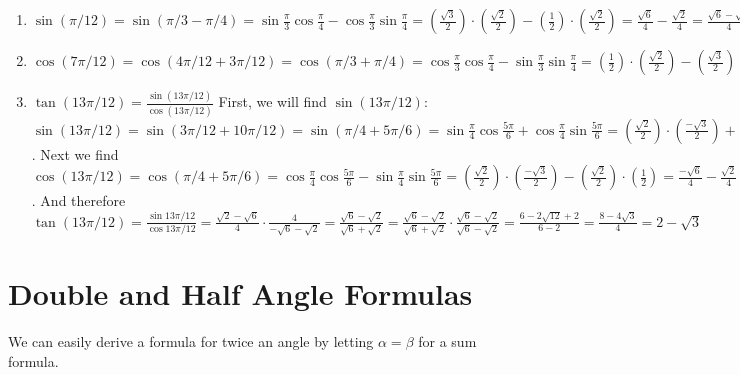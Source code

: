 \begin{Answer}[ref = sum_diff]
\begin{enumerate}
\item $\sin{\left( \pi/12 \right) } = \sin{\left( \pi/3 - \pi/4 \right)} = 
\sin{\frac{\pi}{3}}\cos{\frac{\pi}{4}} - \cos{\frac{\pi}{3}}\sin{\frac{\pi}{4}}
= \left( \frac{\sqrt{3}}{2} \right) \cdot \left(  \frac{\sqrt{2}}{2} \right) - 
\left( \frac{1}{2} \right) \cdot \left( \frac{\sqrt{2}}{2} \right) = \frac{
\sqrt{6}}{4} - \frac{\sqrt{2}}{4} = \frac{\sqrt{6} - \sqrt{2}}{4}$
\item $\cos{\left( 7\pi/12 \right)} = \cos{\left( 4\pi/12 + 3\pi/12 \right)} = 
\cos{ \left( \pi/3 + \pi/4 \right)} = \cos{\frac{\pi}{3}}\cos{\frac{\pi}{4}} - 
\sin{\frac{\pi}{3}}\sin{\frac{\pi}{4}} = \left( \frac{1}{2} \right) \cdot 
\left( \frac{\sqrt{2}}{2} \right) - \left( \frac{\sqrt{3}}{2} \right) \cdot 
\left( \frac{\sqrt{2}}{2} \right) = \frac{\sqrt{2}}{4} - \frac{\sqrt{6}}{4} = 
\frac{\sqrt{2} - \sqrt{6}}{4}$
\item $\tan{ \left( 13\pi/12 \right)} = \frac{\sin{ \left( 13\pi/12 \right)}}{
\cos{ \left( 13\pi/12 \right)}}$ First, we will find $\sin{ \left( 13\pi/12 
\right)}$: $\sin{ \left( 13\pi/12 \right)} = \sin{\left( 3\pi/12 + 10\pi/12 
\right)} = \sin{\left( \pi/4 +  5\pi/6 \right)} = \sin{\frac{\pi}{4}}\cos{
\frac{5\pi}{6}} + \cos{\frac{\pi}{4}}\sin{\frac{5\pi}{6}} = \left( \frac{\sqrt{
2}}{2} \right) \cdot \left( \frac{-\sqrt{3}}{2} \right) + \left( \frac{\sqrt{2}
}{2} \right) \cdot \left( \frac{1}{2} \right) = \frac{-\sqrt{6}}{4} = \frac{
\sqrt{2}}{4} = \frac{\sqrt{2} - \sqrt{6}}{4}$. Next we find $\cos{\left( 13\pi/
12 \right)} = \cos{\left( \pi/4 + 5\pi/6 \right)} = \cos{\frac{\pi}{4}}\cos{
\frac{5\pi}{6}} - \sin{\frac{\pi}{4}}\sin{\frac{5\pi}{6}} = \left( \frac{\sqrt{
2}}{2} \right) \cdot \left( \frac{-\sqrt{3}}{2} \right) - \left( \frac{\sqrt{2
}}{2} \right) \cdot \left( \frac{1}{2} \right) = \frac{-\sqrt{6}}{4} - \frac{
\sqrt{2}}{4} = \frac{-\sqrt{6} - \sqrt{2}}{4}$. And therefore $\tan{ \left( 13
\pi/12 \right)} = \frac{\sin{13\pi/12}}{\cos{13\pi/12}} = \frac{\sqrt{2} - 
\sqrt{6}}{4} \cdot \frac{4}{-\sqrt{6} - \sqrt{2}} = \frac{\sqrt{6} - \sqrt{2}}{
\sqrt{6} + \sqrt{2}} = \frac{\sqrt{6} - \sqrt{2}}{\sqrt{6} + \sqrt{2}} \cdot 
\frac{\sqrt{6} - \sqrt{2}}{\sqrt{6} - \sqrt{2}} = \frac{6 - 2\sqrt{12} + 2}{6 -
2} = \frac{8 - 4\sqrt{3}}{4} = 2 - \sqrt{3}$ 
\end{enumerate}
\end{Answer}

\section{Double and Half Angle Formulas}
We can easily derive a formula for twice an angle by letting $\alpha = \beta$ 
for a sum formula. 


